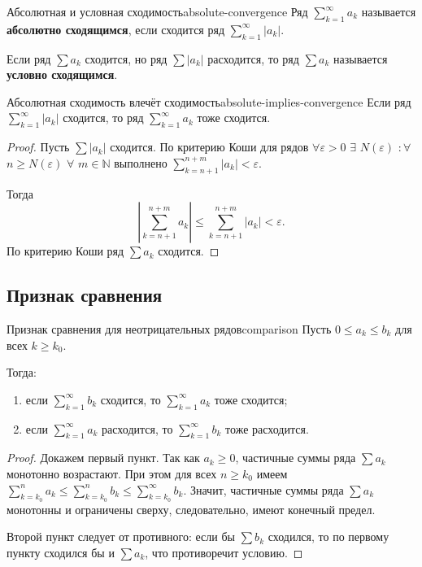 \begin{Definition}{Абсолютная и условная сходимость}{absolute-convergence}
	Ряд $\sum\limits_{k=1}^{\infty} a_k$ называется \textbf{абсолютно сходящимся}, если сходится ряд $\sum\limits_{k=1}^{\infty} |a_k|$.
	
	Если ряд $\sum a_k$ сходится, но ряд $\sum |a_k|$ расходится, то ряд $\sum a_k$ называется \textbf{условно сходящимся}.
\end{Definition}

\begin{Theorem}{Абсолютная сходимость влечёт сходимость}{absolute-implies-convergence}
	Если ряд $\sum\limits_{k=1}^{\infty} |a_k|$ сходится, то ряд $\sum\limits_{k=1}^{\infty} a_k$ тоже сходится.
\end{Theorem}

\begin{proof}
	Пусть $\sum |a_k|$ сходится. По критерию Коши для рядов $ \forall \varepsilon>0$ $\exists$ $N(\varepsilon)$  $: \forall$ $n\ge N(\varepsilon)$ $\forall$ $m\in\mathbb N$ выполнено $\sum\limits_{k=n+1}^{n+m}|a_k|<\varepsilon$.
	
	Тогда
	\[
	\left|\sum_{k=n+1}^{n+m} a_k\right|
	\le
	\sum_{k=n+1}^{n+m}|a_k|
	<
	\varepsilon.
	\]
	По критерию Коши ряд $\sum a_k$ сходится.
\end{proof}

\subsection{Признак сравнения}

\begin{Theorem}{Признак сравнения для неотрицательных рядов}{comparison}
	Пусть $0 \le a_k \le b_k$ для всех $k \ge k_0$.
	
	Тогда:
	
	\begin{enumerate}
		\item если $\sum\limits_{k=1}^{\infty} b_k$ сходится, то $\sum\limits_{k=1}^{\infty} a_k$ тоже сходится;
		\item если $\sum\limits_{k=1}^{\infty} a_k$ расходится, то $\sum\limits_{k=1}^{\infty} b_k$ тоже расходится.
	\end{enumerate}
\end{Theorem}

\begin{proof}
	Докажем первый пункт. Так как $a_k \ge 0$, частичные суммы ряда $\sum a_k$ монотонно возрастают. При этом для всех $n \ge k_0$ имеем $\sum\limits_{k=k_0}^{n} a_k \le \sum\limits_{k=k_0}^{n} b_k \le \sum\limits_{k=k_0}^{\infty} b_k$. Значит, частичные суммы ряда $\sum a_k$ монотонны и ограничены сверху, следовательно, имеют конечный предел.
	
	Второй пункт следует от противного: если бы $\sum b_k$ сходился, то по первому пункту сходился бы и $\sum a_k$, что противоречит условию.
\end{proof}

